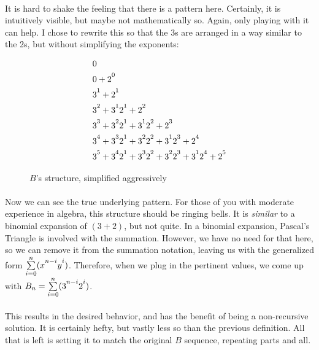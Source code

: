 \documentclass[12pt,letterpaper]{article}
\begin{document}
			\paragraph{} It is hard to shake the feeling that there is a pattern here. Certainly, it is intuitively visible, but maybe not mathematically so. Again, only playing with it can help. I chose to rewrite this so that the 3s are arranged in a way similar to the 2s, but without simplifying the exponents:
			
			\begin{figure}[h]
				\begin{align*}
					&0\\
					&0 + 2\strut^0\\
					&3\strut^1 + 2\strut^1\\
					&3\strut^2 + 3\strut^1 2\strut^1 + 2\strut^2\\
					&3\strut^3 + 3\strut^2 2\strut^1 + 3\strut^1 2\strut^2 + 2\strut^3\\
					&3\strut^4 + 3\strut^3 2\strut^1 + 3\strut^2 2\strut^2+ 3\strut^1 2\strut^3 + 2\strut^4\\
					&3\strut^5 + 3\strut^4 2\strut^1 + 3\strut^3 2\strut^2+ 3\strut^2 2\strut^3 + 3\strut^1 2\strut^4 + 2\strut^5
				\end{align*}
				
				\caption{$B$'s structure, simplified aggressively}
				\label{fig:bAggressive}
			\end{figure}
		
			\paragraph{} Now we can see the true underlying pattern. For those of you with moderate experience in algebra, this structure should be ringing bells. It is \textit{similar} to a binomial expansion of $(3 + 2)$, but not quite. In a binomial expansion, Pascal's Triangle is involved with the summation. However, we have no need for that here, so we can remove it from the summation notation, leaving us with the generalized form $\sum\limits_{i = 0}^n (x\strut^{n-i}y\strut^i)$. Therefore, when we plug in the pertinent values, we come up with $B_n = \sum\limits_{i = 0}^n (3\strut^{n-i}2\strut^i)$.
			
			\paragraph{} This results in the desired behavior, and has the benefit of being a non-recursive solution. It is certainly hefty, but vastly less so than the previous definition. All that is left is setting it to match the original $B$ sequence, repeating parts and all.
			
\end{document}
